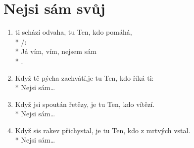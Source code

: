 \section{Nejsi sám svůj}
\begin{enumerate}
\item	{} ti schází odvaha,  tu Ten, kdo pomáhá,\\*
	/:      \\*
	Já vím,  vím, nejsem  sám  \\*
	       . 
\item	Když tě pýcha zachvátí,je tu Ten, kdo říká ti:\\*
	Nejsi sám…
\item	Když jsi spoután řetězy, je tu Ten, kdo vítězí.\\*
	Nejsi sám…
\item	Když sis rakev přichystal, je tu Ten, kdo z mrtvých vstal.\\*
	Nejsi sám…
\end{enumerate}

